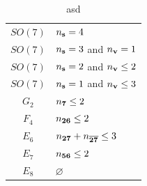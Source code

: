 \documentclass[letterpaper, 11pt]{article}
\begin{document}
{\begin{table}[tbp]
\begin{tabular}{@{}cl@{}}
    $SO(7)$  & $n_{\bf s} = 4$ \\
    $SO(7)$  & $n_{\bf s} = 3$ and  $n_{\bf v}  =1$\\
    $SO(7)$  & $n_{\bf s} = 2$ and  $n_{\bf v}  \leq 2$\\
    $SO(7)$  & $n_{\bf s} = 1$ and  $n_{\bf v}  \leq 3$\\
    $G_2$  & $n_{\bf 7}\leq 2$ \\
    $F_4$  & $n_{\bf 26}\leq 2$ \\
    $E_6$  & $n_{\bf 27}+ n_{\bf \overline{27}} \leq 3$\\
    $E_7$  & $n_{\bf 56} \leq 2$ \\ 
    $E_8$  & $\varnothing$ \\ \bottomrule
    \end{tabular}
    \caption{asd}
    \label{tbl:exceptional-theory}
\end{table}



}
\end{document}
